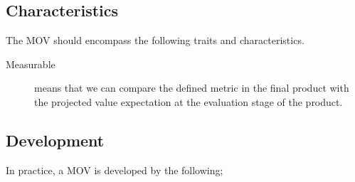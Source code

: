 \documentclass[11pt]{article}
\begin{document}
\subsection{Characteristics}
The MOV should encompass the following traits and characteristics.
\begin{description}
    \item[Measurable]
        means that we can compare the defined metric in the final product with
        the projected value expectation at the evaluation stage of the product.
\end{description}

\subsection{Development}
In practice, a MOV is developed by the following;
\end{document}
